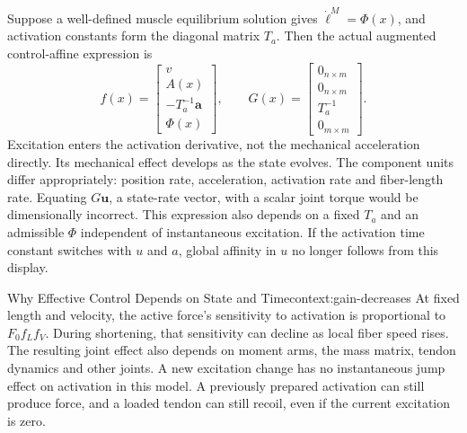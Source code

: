 Suppose a well-defined muscle equilibrium solution gives $\dot{\boldsymbol\ell}^M=\Phi(x)$, and activation constants form the diagonal matrix $T_a$. Then the actual augmented control-affine expression is
\begin{equation}
f(x)=\begin{bmatrix}v\\A(x)\\-T_a^{-1}\boldsymbol a\\\Phi(x)\end{bmatrix},
\qquad
G(x)=\begin{bmatrix}0_{n\times m}\\0_{n\times m}\\T_a^{-1}\\0_{m\times m}\end{bmatrix}.
\label{eq:control-affine-full}
\end{equation}
Excitation enters the activation derivative, not the mechanical acceleration directly. Its mechanical effect develops as the state evolves. The component units differ appropriately: position rate, acceleration, activation rate and fiber-length rate. Equating $G\boldsymbol u$, a state-rate vector, with a scalar joint torque would be dimensionally incorrect. This expression also depends on a fixed $T_a$ and an admissible $\Phi$ independent of instantaneous excitation. If the activation time constant switches with $u$ and $a$, global affinity in $u$ no longer follows from this display.

\begin{laymansbox}{Why Effective Control Depends on State and Time}{context:gain-decreases}
At fixed length and velocity, the active force's sensitivity to activation is proportional to $F_0 f_L f_V$. During shortening, that sensitivity can decline as local fiber speed rises. The resulting joint effect also depends on moment arms, the mass matrix, tendon dynamics and other joints. A new excitation change has no instantaneous jump effect on activation in this model. A previously prepared activation can still produce force, and a loaded tendon can still recoil, even if the current excitation is zero.
\end{laymansbox}

